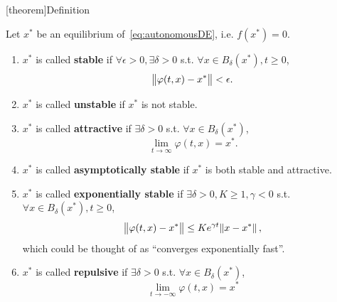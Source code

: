 \documentclass[12pt]{report}
\theoremstyle{definition}
\begin{document}
[theorem]{Definition}
\begin{notions of stability}
    Let $x^{*}$ be an equilibrium of~\eqref{eq:autonomousDE}, i.e. $f(x^{*})=0$.
    \begin{enumerate}[label = (\roman*)]
        \item $x^{*}$ is called \textbf{stable} if $\forall \epsilon>0,
            \exists \delta>0$ s.t. $\forall x\in B_\delta(x^{*}), t\ge 0$,
            \[
                \norm{\varphi(t,x)-x^{*}}<\epsilon.
            \]
        \item $x^{*}$ is called \textbf{unstable} if $x^{*}$ is not stable.
        \item $x^{*}$ is called \textbf{attractive} if $\exists \delta>0$ s.t.
            $\forall x\in B_\delta(x^{*})$,
            \[
                \lim_{t\rightarrow\infty}\varphi(t,x)=x^{*}.
            \]
        \item $x^{*}$ is called \textbf{asymptotically stable} if $x^{*}$
            is both stable and attractive.
        \item $x^{*}$ is called \textbf{exponentially stable} if 
            $\exists \delta>0, K\ge 1, \gamma<0$ s.t. 
            $\forall x\in B_\delta(x^{*}), t\ge 0$,
            \[
                \norm{\varphi(t,x)-x^{*}}\le Ke^{\gamma t}\norm{x-x^{*}},
            \]
            which could be thought of as ``converges exponentially fast''.
        \item $x^{*}$ is called \textbf{repulsive} if $\exists \delta>0$ s.t.
            $\forall x\in B_{\delta}(x^{*})$,
            \[
                \lim_{t\rightarrow-\infty}\varphi(t,x)=x^{*}
            \]
    \end{enumerate} 
\end{notions of stability}
\end{document}
